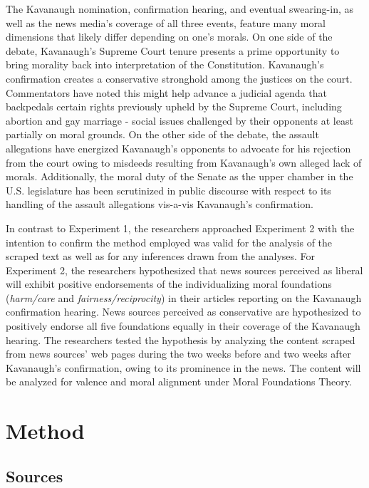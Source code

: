 \documentclass[,man]{apa6}
\begin{document}
The Kavanaugh nomination, confirmation hearing, and eventual
swearing-in, as well as the news media's coverage of all three events,
feature many moral dimensions that likely differ depending on one's
morals. On one side of the debate, Kavanaugh's Supreme Court tenure
presents a prime opportunity to bring morality back into interpretation
of the Constitution. Kavanaugh's confirmation creates a conservative
stronghold among the justices on the court. Commentators have noted this
might help advance a judicial agenda that backpedals certain rights
previously upheld by the Supreme Court, including abortion and gay
marriage - social issues challenged by their opponents at least
partially on moral grounds. On the other side of the debate, the assault
allegations have energized Kavanaugh's opponents to advocate for his
rejection from the court owing to misdeeds resulting from Kavanaugh's
own alleged lack of morals. Additionally, the moral duty of the Senate
as the upper chamber in the U.S. legislature has been scrutinized in
public discourse with respect to its handling of the assault allegations
vis-a-vis Kavanaugh's confirmation.

In contrast to Experiment 1, the researchers approached Experiment 2
with the intention to confirm the method employed was valid for the
analysis of the scraped text as well as for any inferences drawn from
the analyses. For Experiment 2, the researchers hypothesized that news
sources perceived as liberal will exhibit positive endorsements of the
individualizing moral foundations (\emph{harm/care} and
\emph{fairness/reciprocity}) in their articles reporting on the
Kavanaugh confirmation hearing. News sources perceived as conservative
are hypothesized to positively endorse all five foundations equally in
their coverage of the Kavanaugh hearing. The researchers tested the
hypothesis by analyzing the content scraped from news sources' web pages
during the two weeks before and two weeks after Kavanaugh's
confirmation, owing to its prominence in the news. The content will be
analyzed for valence and moral alignment under Moral Foundations Theory.

\section{Method}\label{method-1}

\subsection{Sources}\label{sources-1}
\end{document}
